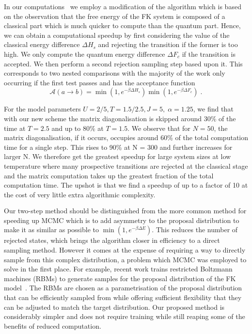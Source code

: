 In our computations~\autocite{hodsonMCMCFKModel2021} we employ a modification of the algorithm which is based on the observation that the free energy of the FK system is composed of a classical part which is much quicker to compute than the quantum part. Hence, we can obtain a computational speedup by first considering the value of the classical energy difference \(\Delta H_s\) and rejecting the transition if the former is too high. We only compute the quantum energy difference \(\Delta F_c\) if the transition is accepted. We then perform a second rejection sampling step based upon it. This corresponds to two nested comparisons with the majority of the work only occurring if the first test passes and has the acceptance function \[\mathcal{A}(a \to b) = \min\left(1, e^{-\beta \Delta H_s}\right)\min\left(1, e^{-\beta \Delta F_c}\right)\;.\]

For the model parameters \(U=2/5, T = 1.5 / 2.5, J = 5,\;\alpha = 1.25\), we find that with our new scheme the matrix diagonalisation is skipped around 30\% of the time at \(T = 2.5\) and up to 80\% at \(T = 1.5\). We observe that for \(N = 50\), the matrix diagonalisation, if it occurs, occupies around 60\% of the total computation time for a single step. This rises to 90\% at N = 300 and further increases for larger N. We therefore get the greatest speedup for large system sizes at low temperature where many prospective transitions are rejected at the classical stage and the matrix computation takes up the greatest fraction of the total computation time. The upshot is that we find a speedup of up to a factor of 10 at the cost of very little extra algorithmic complexity.

Our two-step method should be distinguished from the more common method for speeding up MCMC which is to add asymmetry to the proposal distribution to make it as similar as possible to \(\min\left(1, e^{-\beta \Delta E}\right)\). This reduces the number of rejected states, which brings the algorithm closer in efficiency to a direct sampling method. However it comes at the expense of requiring a way to directly sample from this complex distribution, a problem which MCMC was employed to solve in the first place. For example, recent work trains restricted Boltzmann machines (RBMs) to generate samples for the proposal distribution of the FK model~\autocite{huangAcceleratedMonteCarlo2017}. The RBMs are chosen as a parametrisation of the proposal distribution that can be efficiently sampled from while offering sufficient flexibility that they can be adjusted to match the target distribution. Our proposed method is considerably simpler and does not require training while still reaping some of the benefits of reduced computation.

